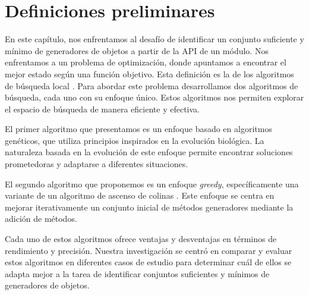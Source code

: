 
\section{Definiciones preliminares}
\label{sec:preliminares}


En este capítulo, nos enfrentamos al desafío de identificar un conjunto suficiente y mínimo de generadores de objetos a partir de la API de un módulo. 
Nos enfrentamos a un problema de optimización, donde apuntamos a encontrar el mejor estado según una función objetivo.
Esta definición es la de los algoritmos de búsqueda local \cite{Russell:2009}.
Para abordar este problema desarrollamos dos algoritmos de búsqueda, cada uno con su enfoque único. Estos algoritmos nos permiten explorar el espacio de búsqueda de manera eficiente y efectiva.

El primer algoritmo que presentamos es un enfoque basado en algoritmos genéticos, que utiliza principios inspirados en la evolución biológica. \cite{Goldberg:1989}
La naturaleza basada en la evolución de este enfoque permite encontrar soluciones prometedoras y adaptarse a diferentes situaciones.

El segundo algoritmo que proponemos es un enfoque \emph{greedy}, específicamente una variante de un algoritmo de ascenso de colinas \cite{Russell:2009,Cormen2009}. Este enfoque se centra en mejorar iterativamente un conjunto inicial de métodos generadores mediante la adición de métodos.


Cada uno de estos algoritmos ofrece ventajas y desventajas en términos de rendimiento y precisión. Nuestra investigación se centró en comparar y evaluar estos algoritmos en diferentes casos de estudio para determinar cuál de ellos se adapta mejor a la tarea de identificar conjuntos suficientes y mínimos de generadores de objetos.


